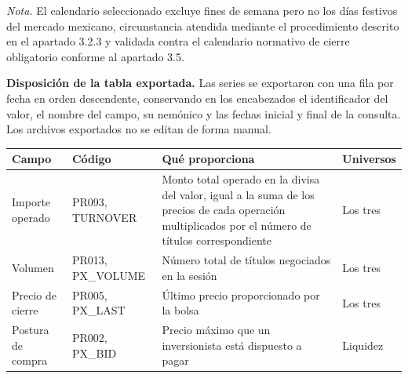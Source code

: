 \emph{Nota.} El calendario seleccionado excluye fines de semana pero no los días festivos del mercado mexicano, circunstancia atendida mediante el procedimiento descrito en el apartado 3.2.3 y validada contra el calendario normativo de cierre obligatorio conforme al apartado 3.5.

\textbf{Disposición de la tabla exportada.} Las series se exportaron con una fila por fecha en orden descendente, conservando en los encabezados el identificador del valor, el nombre del campo, su nemónico y las fechas inicial y final de la consulta. Los archivos exportados no se editan de forma manual.



{\small
\begin{longtable}[]{@{}
  >{\raggedright\arraybackslash}p{}
  >{\raggedright\arraybackslash}p{}
  >{\raggedright\arraybackslash}p{}
  >{\raggedright\arraybackslash}p{}@{}}
\toprule\noalign{}
\begin{minipage}[b]{\linewidth}\raggedright
\textbf{Campo}
\end{minipage} & \begin{minipage}[b]{\linewidth}\raggedright
\textbf{Código}
\end{minipage} & \begin{minipage}[b]{\linewidth}\raggedright
\textbf{Qué proporciona}
\end{minipage} & \begin{minipage}[b]{\linewidth}\raggedright
\textbf{Universos}
\end{minipage} \\
\midrule\noalign{}
\endhead
\bottomrule\noalign{}
\endlastfoot
Importe operado & PR093, TURNOVER & Monto total operado en la divisa del valor, igual a la suma de los precios de cada operación multiplicados por el número de títulos correspondiente & Los tres \\
Volumen & PR013, PX\_VOLUME & Número total de títulos negociados en la sesión & Los tres \\
Precio de cierre & PR005, PX\_LAST & Último precio proporcionado por la bolsa & Los tres \\
Postura de compra & PR002, PX\_BID & Precio máximo que un inversionista está dispuesto a pagar & Liquidez \\

\end{longtable}}
